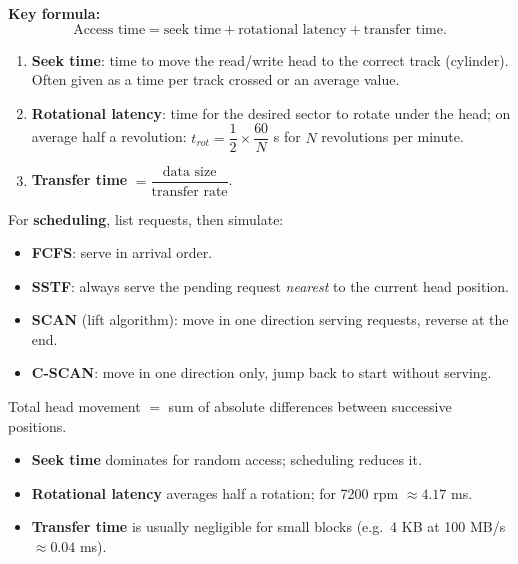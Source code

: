 \documentclass[11pt]{article}
\newcommand{\cle}[1]{{\popxbold\color{popdark}#1}}
\begin{document}
\begin{methode}
\textbf{Key formula:}
\[ \text{Access time} = \text{seek time} + \text{rotational latency} + \text{transfer time}. \]
\begin{enumerate}
\item \textbf{Seek time}: time to move the read/write head to the correct \cle{track} (cylinder). Often given as a time per track crossed or an average value.
\item \textbf{Rotational latency}: time for the desired \cle{sector} to rotate under the head; on average half a revolution: $t_{rot} = \dfrac{1}{2}\times\dfrac{60}{N}$ s for $N$ revolutions per minute.
\item \textbf{Transfer time} $= \dfrac{\text{data size}}{\text{transfer rate}}$.
\end{enumerate}
For \textbf{scheduling}, list requests, then simulate:
\begin{itemize}
\item \textbf{FCFS}: serve in arrival order.
\item \textbf{SSTF}: always serve the pending request \emph{nearest} to the current head position.
\item \textbf{SCAN} (lift algorithm): move in one direction serving requests, reverse at the end.
\item \textbf{C-SCAN}: move in one direction only, jump back to start without serving.
\end{itemize}
Total head movement $=$ sum of absolute differences between successive positions.
\end{methode}

\begin{aretenir}
\begin{itemize}
\item \textbf{Seek time} dominates for random access; scheduling reduces it.
\item \textbf{Rotational latency} averages half a rotation; for 7200 rpm $\approx 4.17$ ms.
\item \textbf{Transfer time} is usually negligible for small blocks (e.g.\ 4 KB at 100 MB/s $\approx 0.04$ ms).
\end{itemize}
\end{aretenir}
\end{document}
